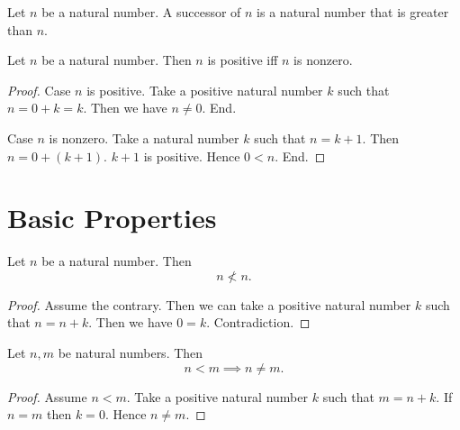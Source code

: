 \documentclass[10pt]{article}
\begin{document}
  \begin{forthel}
    \begin{definition}
      Let $n$ be a natural number.
      A successor of $n$ is a natural number that is greater than $n$.
    \end{definition}
  \end{forthel}

  \begin{forthel}
    \begin{proposition}
      Let $n$ be a natural number.
      Then $n$ is positive iff $n$ is nonzero.
    \end{proposition}
    \begin{proof}
      Case $n$ is positive.
        Take a positive natural number $k$ such that $n = 0 + k = k$.
        Then we have $n \neq 0$.
      End.

      Case $n$ is nonzero.
        Take a natural number $k$ such that $n = k + 1$.
        Then $n = 0 + (k + 1)$.
        $k + 1$ is positive.
        Hence $0 < n$.
      End.
    \end{proof}
  \end{forthel}


  \section{Basic Properties}

  \begin{forthel}
    \begin{proposition}
      Let $n$ be a natural number.
      Then \[ n \nless n. \]
    \end{proposition}
    \begin{proof}
      Assume the contrary.
      Then we can take a positive natural number $k$ such that $n = n + k$.
      Then we have $0 = k$.
      Contradiction.
    \end{proof}
  \end{forthel}

  \begin{forthel}
    \begin{proposition}
      Let $n, m$ be natural numbers.
      Then \[ n < m \implies n \neq m. \]
    \end{proposition}
    \begin{proof}
      Assume $n < m$.
      Take a positive natural number $k$ such that $m = n + k$.
      If $n = m$ then $k = 0$.
      Hence $n \neq m$.
    \end{proof}
  \end{forthel}
\end{document}
